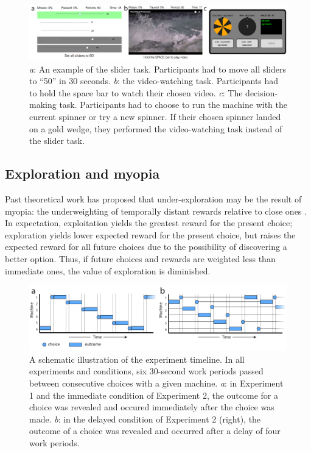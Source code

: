 \documentclass[10pt,letterpaper]{article}
\begin{document}
\begin{figure}
\centering
\includegraphics[width=\textwidth]{figures/taskpictures.png}
\caption{\emph{a}: An example of the slider task. Participants had to move all
  sliders to ``50'' in 30 seconds. \emph{b}: the video-watching task.
  Participants had to hold the space bar to watch their chosen video. \emph{c}:
  The decision-making task. Participants had to choose to run the machine with
  the current spinner or try a new spinner. If their chosen spinner landed on
  a gold wedge, they performed the video-watching task instead of the
  slider task.}
\label{fig:taskpictures}
\end{figure}

\subsection{Exploration and myopia}

Past theoretical work has proposed that under-exploration may be the result of myopia: the
underweighting of temporally distant rewards relative to close ones \citep{March1991, Levinthal1993}. 
In expectation, exploitation yields the greatest reward for the present choice;
exploration yields lower expected reward for the present choice, but raises the
expected reward for all future choices due to the possibility of discovering
a better option. Thus, if future choices and rewards are weighted less than
immediate ones, the value of exploration is diminished.


\begin{figure}
\centering
\includegraphics[width=\textwidth]{figures/machinetimeline.png}
\caption{A schematic illustration of the experiment timeline. In all experiments
  and conditions, six 30-second work periods passed between consecutive choices
  with a given machine. \emph{a}: in Experiment 1 and the immediate condition of
  Experiment 2, the outcome for a choice was revealed and occured immediately
  after the choice was made. \emph{b}: in the delayed condition of Experiment 2 (right),
  the outcome of a choice was revealed and occurred after a delay of four work
  periods.}
\label{fig:machinetimeline}
\end{figure}
\end{document}
